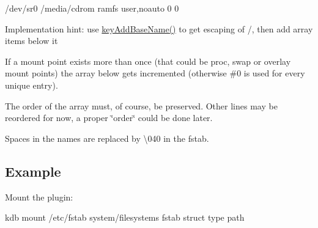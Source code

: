 \begin{DoxyCode}
/dev/sr0        /media/cdrom   ramfs user,noauto     0       0
\end{DoxyCode}


Implementation hint\+: use {\ttfamily \hyperlink{group__keyname_gaa942091fc4bd5c2699e49ddc50829524}{key\+Add\+Base\+Name()}} to get escaping of {\ttfamily /}, then add array items below it

If a mount point exists more than once (that could be proc, swap or overlay mount points) the array below gets incremented (otherwise \#0 is used for every unique entry).

The order of the array must, of course, be preserved. Other lines may be reordered for now, a proper \char`\"{}order\char`\"{} could be done later.

Spaces in the names are replaced by \textbackslash{}040 in the fstab.

\subsection*{Example}

Mount the plugin\+:


\begin{DoxyCode}
kdb mount /etc/fstab system/filesystems fstab struct type path
\end{DoxyCode}
 